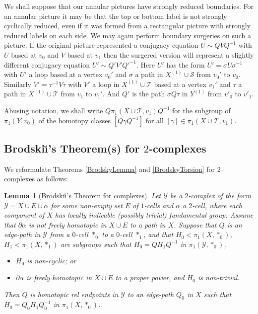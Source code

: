 \documentclass[12pt,a4paper]{amsart}
\def\a{\alpha}
\def\cS{\mathcal{S}}
\def\cT{\mathcal{T}}
\newtheorem{lem}[thm]{Lemma}
\begin{document}
We shall suppose that our annular pictures have 
	strongly reduced boundaries. 
For an annular  picture it may be that the top or bottom label is not strongly cyclically reduced, 
even if it was formed from a 
rectangular picture with strongly reduced labels on each side.  
We may again perform boundary surgeries on such a picture.   
If the original picture represented a conjugacy equation   $U\sim QVQ^{-1}$
with $U$ based at $v_0$ and
$V$ based at $v_1$   
then the surgered version will represent a slightly different conjugacy equation 
 $U'\sim Q'V'{Q'}^{-1}$.  
Here  $U'$ 
has the form $U'=\sigma U\sigma^{-1}$  with 
$U'$ a loop based at a vertex $v_0'$ and  $\sigma$ a path in $X^{(1)}\cup\cS$  
from $v_0'$   to $v_0$.     
Similarly $V'=\tau^{-1}V\tau$ with $V'$ a loop in $X^{(1)}\cup\cT$ based at a vertex $v_1'$
and   $\tau$ a path in $X^{(1)}\cup\cT$ 
from  $v_1$   to $v_1'$.
And $Q'$ is the path $\sigma Q\tau$ in $Y^{(1)}$ from $v'_0$ to $v'_1$.

Abusing notation, we shall write $Q\pi_1(X\cup\cT,v_1)Q^{-1}$ for the subgroup of $\pi_1(Y,v_0)$
of the homotopy classes $[Q\gamma Q^{-1}]$ for all $[\gamma]\in\pi_1(X\cup\cT,v_1)$.

 
\subsection{Brodski\u\i's Theorem(s) for $2$-complexes}

We reformulate  Theorems \ref{BrodskyLemma}   and \ref{BrodskyTorsion}  for 2--complexes as follows:


\begin{lem}[Brodski\u\i's Theorem for complexes]\label{Br}
	Let $\mathcal{Y}$ be  a  $2$-complex of the form $\mathcal{Y}=X\cup E\cup \a$	 
	for some non-empty set $E$ of $1$-cells and $\a$ a $2$-cell, 
	where each component of $X$ has locally indicable  (possibly trivial) fundamental group.  
	Assume that $\partial\a$ is not freely homotopic in $X\cup E$ 
	to a path in $X$.   
	Suppose that $Q$ is an edge-path in $\mathcal{Y}$ from a $0$-cell $*_0$ to a $0$-cell $*_1$, 
	and that $H_0<\pi_1(X,*_0)$, $ H_1< \pi_1(X,*_1)$ are 
	subgroups such that $H_0=Q  H_1Q^{-1}$ in $\pi_1(\mathcal{Y},*_0)$,  
	\begin{itemize}
		\item $ H_0$ is non-cyclic; or
		\item $\partial\a$ is freely homotopic in $X\cup E$ to a proper power, and $H_0$ is non-trivial.
	\end{itemize} 
	Then $Q$ is homotopic rel endpoints in $\mathcal{Y}$ to an edge-path  $Q_0$ in $X$  
	such that $H_0=Q_0 H_1 Q_0^{-1}$ in $\pi_1(X,*_0)$.
\end{lem}
\end{document}
